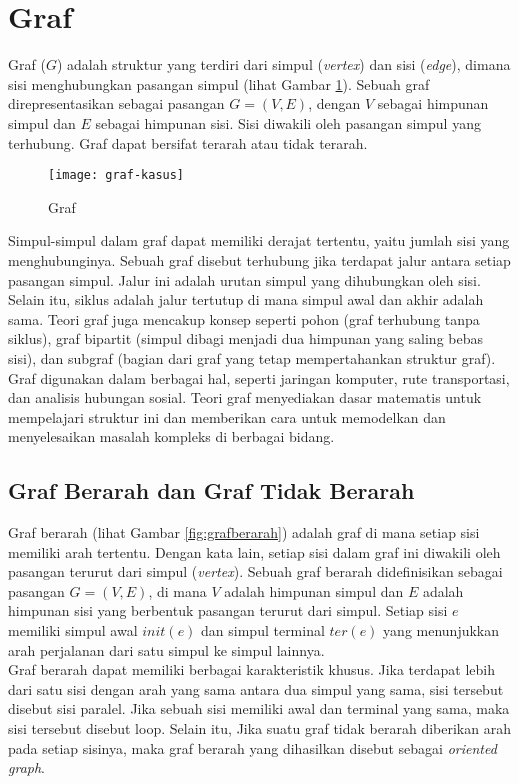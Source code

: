 \section{Graf ~\cite{Diestel:17:graph}}
\label{sec:graph}
Graf ($G$) adalah struktur yang terdiri dari simpul (\textit{vertex}) dan sisi (\textit{edge}), dimana sisi menghubungkan pasangan simpul (lihat Gambar \ref{fig:graf}). Sebuah graf direpresentasikan sebagai pasangan $G=(V,E)$, dengan $V$ sebagai himpunan simpul dan $E$ sebagai himpunan sisi. Sisi diwakili oleh pasangan simpul yang terhubung. Graf dapat bersifat terarah atau tidak terarah.
\begin{figure}[h] 
    \centering  
    \texttt{[image: graf-kasus]}  
    \caption{Graf}
    \label{fig:graf} 
\end{figure}
\noindent
Simpul-simpul dalam graf dapat memiliki derajat tertentu, yaitu jumlah sisi yang menghubunginya. Sebuah graf disebut terhubung jika terdapat jalur antara setiap pasangan simpul. Jalur ini adalah urutan simpul yang dihubungkan oleh sisi. Selain itu, siklus adalah jalur tertutup di mana simpul awal dan akhir adalah sama. Teori graf juga mencakup konsep seperti pohon (graf terhubung tanpa siklus), graf bipartit (simpul dibagi menjadi dua himpunan yang saling bebas sisi), dan subgraf (bagian dari graf yang tetap mempertahankan struktur graf).
\\
Graf digunakan dalam berbagai hal, seperti jaringan komputer, rute transportasi, dan analisis hubungan sosial. Teori graf menyediakan dasar matematis untuk mempelajari struktur ini dan memberikan cara untuk memodelkan dan menyelesaikan masalah kompleks di berbagai bidang.
\newpage
\subsection{Graf Berarah dan Graf Tidak Berarah~\cite{Diestel:17:graph}}
\label{sec:grafberarah}
Graf berarah (lihat Gambar \ref{fig:grafberarah}) adalah graf di mana setiap sisi memiliki arah tertentu. Dengan kata lain, setiap sisi dalam graf ini diwakili oleh pasangan terurut dari simpul (\textit{vertex}). Sebuah graf berarah didefinisikan sebagai pasangan $G=(V,E)$, di mana $V$ adalah himpunan simpul dan $E$ adalah himpunan sisi yang berbentuk pasangan terurut dari simpul. Setiap sisi $e$ memiliki simpul awal $init(e)$ dan simpul terminal $ter(e)$ yang menunjukkan arah perjalanan dari satu simpul ke simpul lainnya.
\\
Graf berarah dapat memiliki berbagai karakteristik khusus. Jika terdapat lebih dari satu sisi dengan arah yang sama antara dua simpul yang sama, sisi tersebut disebut sisi paralel. Jika sebuah sisi memiliki awal dan terminal yang sama, maka sisi tersebut disebut loop. Selain itu, Jika suatu graf tidak berarah diberikan arah pada setiap sisinya, maka graf berarah yang dihasilkan disebut sebagai \textit{oriented graph}.

